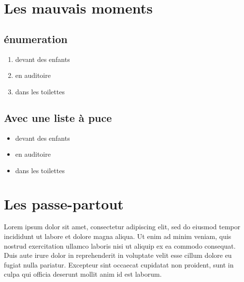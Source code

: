 \documentclass[a4paper, 11pt]{article}
\begin{document}
\section{Les mauvais moments}

\subsection{énumeration}

\begin{enumerate}
\item devant des enfants
\item en auditoire
\item dans les toilettes
\end{enumerate}

\subsection{Avec une liste à puce}

\begin{itemize}
\item devant des enfants
\item en auditoire
\item dans les toilettes
\end{itemize}

\section{Les passe-partout}

Lorem ipsum dolor sit amet, consectetur adipiscing elit, sed do eiusmod tempor incididunt ut labore et dolore magna aliqua. Ut enim ad minim veniam, quis nostrud exercitation ullamco laboris nisi ut aliquip ex ea commodo consequat. Duis aute irure dolor in reprehenderit in voluptate velit esse cillum dolore eu fugiat nulla pariatur. Excepteur sint occaecat cupidatat non proident, sunt in culpa qui officia deserunt mollit anim id est laborum.
\end{document}
